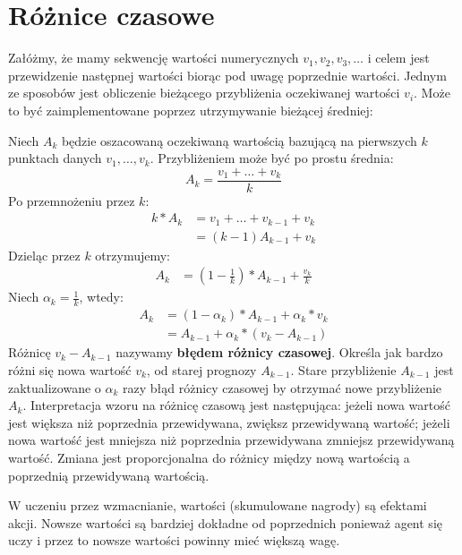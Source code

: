 \documentclass[a4paper, 12pt,oneside]{book}
\begin{document}
\section{Różnice czasowe}
Załóżmy, że mamy sekwencję wartości numerycznych $v_1,v_2,v_3,\dots$ i celem
jest przewidzenie następnej wartości biorąc pod uwagę poprzednie wartości.
Jednym ze sposobów jest obliczenie bieżącego przybliżenia oczekiwanej wartości
$v_i$. Może to być zaimplementowane poprzez utrzymywanie bieżącej średniej:

Niech $A_k$ będzie oszacowaną oczekiwaną wartością bazującą na pierwszych $k$
punktach danych $v_1, \dots, v_k$. Przybliżeniem może być po prostu średnia:
\[A_k = \frac{v_1 + \dots + v_k}{k}\]
Po przemnożeniu przez $k$:
\begin{equation} \label{td_1}
\begin{split}
	k * A_k &= v_1 + \dots + v_{k-1} + v_k \\
	        &= (k-1)A_{k-1} + v_k
\end{split}
\end{equation}
Dzieląc przez $k$ otrzymujemy:
\begin{equation} \label{td_2}
\begin{split}
	A_k &= \left( 1 - \frac{1}{k} \right) * A_{k-1} + \frac{v_k}{k}
\end{split}
\end{equation}
Niech $\alpha_k = \frac{1}{k}$, wtedy:
\begin{equation} \label{td_3}
\begin{split}
	A_k &= (1 - \alpha_k) * A_{k-1} + \alpha_k * v_k \\
	    &= A_{k-1} + \alpha_k * (v_k - A_{k-1})
\end{split}
\end{equation}
Różnicę $v_k - A_{k-1}$ nazywamy \textbf{błędem różnicy czasowej}. Określa jak
bardzo różni się nowa wartość $v_k$, od starej prognozy $A_{k-1}$. Stare
przybliżenie $A_{k-1}$ jest zaktualizowane o $\alpha_k$ razy błąd różnicy
czasowej by otrzymać nowe przybliżenie $A_k$. Interpretacja wzoru na różnicę
czasową jest następująca: jeżeli nowa wartość jest większa niż poprzednia
przewidywana,
zwiększ przewidywaną wartość; jeżeli nowa wartość jest mniejsza niż poprzednia
przewidywana zmniejsz przewidywaną wartość. Zmiana jest proporcjonalna do
różnicy między nową wartością a poprzednią przewidywaną wartością.

W uczeniu przez wzmacnianie, wartości (skumulowane nagrody) są efektami akcji.
Nowsze wartości są bardziej dokładne od poprzednich ponieważ agent się uczy i
przez to nowsze wartości powinny mieć większą wagę.
\end{document}
